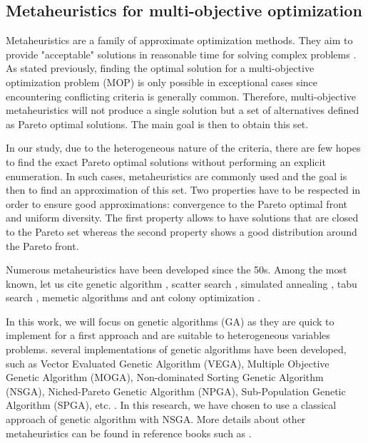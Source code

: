 \subsection{Metaheuristics for multi-objective optimization}
\label{subsec:metaheuristics}
Metaheuristics are a family of approximate optimization methods. They aim to provide "acceptable" solutions in reasonable time for solving complex problems \cite{talbi09}. As stated previously, finding the optimal solution for a multi-objective optimization problem (MOP) is only possible in exceptional cases since encountering conflicting criteria is generally common. Therefore, multi-objective metaheuristics will not produce a single solution but a set of alternatives defined as Pareto optimal solutions. The main goal is then to obtain this set.

In our study, due to the heterogeneous nature of the criteria, there are few hopes to find the exact Pareto optimal solutions without performing an explicit enumeration. In such cases, metaheuristics are commonly used and the goal is then to find an approximation of this set. Two properties have to be respected in order to ensure good approximations: convergence to the Pareto optimal front and uniform diversity. The first property allows to have solutions that are closed to the Pareto set whereas the second property shows a good distribution around the Pareto front.

Numerous metaheuristics have been developed since the 50s. Among the most known, let us cite genetic algorithm \cite{holland1975adaptation}, scatter search \cite{Glover77}, simulated annealing \cite{KirkpatrickGelattVecchi83}, tabu search \cite{Glover86}, memetic algorithms \cite{moscato89on} and ant colony optimization \cite{Dor92a.phd}.

In this work, we will focus on genetic algorithms (GA) as they are quick to implement for a first approach and are suitable to heterogeneous variables problems. several implementations of genetic algorithms have been developed, such as Vector Evaluated Genetic Algorithm (VEGA), Multiple Objective Genetic Algorithm (MOGA), Non-dominated Sorting Genetic Algorithm (NSGA), Niched-Pareto Genetic Algorithm (NPGA), Sub-Population Genetic Algorithm (SPGA), etc. \cite{Deb:2001:MOU:559152}. In this research, we have chosen to use a classical approach of genetic algorithm with NSGA. More details about other metaheuristics can be found in reference books such as \cite{talbi09,dreo06metaheuristics,8125462}.


